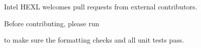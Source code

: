 Intel H\+E\+XL welcomes pull requests from external contributors.

Before contributing, please run 
\begin{DoxyCode}{0}
\end{DoxyCode}


to make sure the formatting checks and all unit tests pass. 